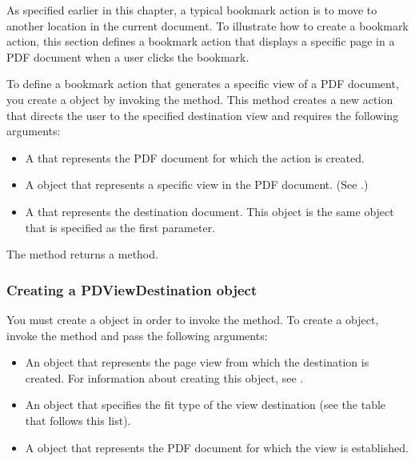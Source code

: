 \documentclass[letterpaper,12pt,english,openany,oneside]{sphinxmanual}
\begin{document}
As specified earlier in this chapter, a typical bookmark action is to move to another location in the current document. To illustrate how to create a bookmark action, this section defines a bookmark action that displays a specific page in a PDF document when a user clicks the bookmark.

To define a bookmark action that generates a specific view of a PDF document, you create a  object by invoking the  method. This method creates a new action that directs the user to the specified destination view and requires the following arguments:
\begin{itemize}
\item {} 
A  that represents the PDF document for which the action is created.

\item {} 
A  object that represents a specific view in the PDF document. (See .)

\item {} 
A  that represents the destination document. This object is the same object that is specified as the first parameter.

\end{itemize}

The  method returns a  method.


\subsubsection{Creating a PDViewDestination object}
\label{\detokenize{Plugins_Bookmark:creating-a-pdviewdestination-object}}
You must create a  object in order to invoke the  method. To create a  object, invoke the  method and pass the following arguments:
\begin{itemize}
\item {} 
An  object that represents the page view from which the destination is created. For information about creating this object, see .

\item {} 
An  object that specifies the fit type of the view destination (see the table that follows this list).

\item {} 
A  object that represents the PDF document for which the view is established.

\end{itemize}
\end{document}
